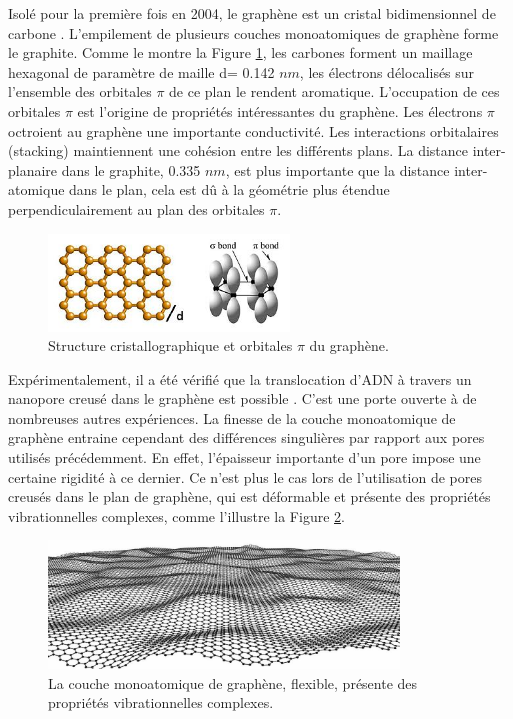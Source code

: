 \documentclass[a4paper,11pt]{article}
\begin{document}
Isolé pour la première fois en 2004, le graphène est un cristal bidimensionnel de carbone \cite{graph}. L'empilement de plusieurs couches monoatomiques de graphène forme le graphite. Comme le montre la Figure \ref{orbit}, les carbones forment un maillage hexagonal de paramètre de maille d= 0.142 $nm$, les électrons délocalisés sur l'ensemble des orbitales $\pi$ de ce plan le rendent aromatique. L'occupation de ces orbitales $\pi$ est l'origine de propriétés intéressantes du graphène. Les électrons $\pi$ octroient au graphène une importante conductivité. Les interactions orbitalaires (stacking) maintiennent une cohésion entre les différents plans. La distance inter-planaire dans le graphite, 0.335 $nm$, est plus importante que la distance inter-atomique dans le plan, cela est dû à la géométrie plus étendue perpendiculairement au plan des orbitales $\pi$.

\begin{figure}[H]
\begin{center}
\includegraphics[width=0.57\textwidth]{orbitals2.jpg} 
\caption{Structure cristallographique et orbitales $\pi$ du graphène.}
\label{orbit}
\end{center}
\end{figure}
 
Expérimentalement, il a été vérifié que la translocation d'ADN à travers un nanopore creusé dans le graphène est possible \cite{dnatrans}. C'est une porte ouverte à de nombreuses autres expériences. La finesse de la couche monoatomique de graphène entraine cependant des différences singulières par rapport aux pores utilisés précédemment. En effet, l'épaisseur importante d'un pore impose une certaine rigidité à ce dernier. Ce n'est plus le cas lors de l'utilisation de pores creusés dans le plan de graphène, qui est déformable et présente des propriétés vibrationnelles complexes, comme l'illustre la Figure \ref{vib}.


\begin{figure}[H]
\begin{center}
\includegraphics[width=0.83\textwidth]{vib.jpg} 
\caption{La couche monoatomique de graphène, flexible, présente des propriétés vibrationnelles complexes.}
\label{vib}
\end{center}
\end{figure}
\end{document}
